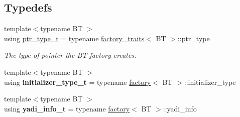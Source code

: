 \subsection*{Typedefs}
\begin{DoxyCompactItemize}
\item 
\mbox{\label{namespaceyadi_a92290eb27cd90666aa87b17d854af9fe}} 
{\footnotesize template$<$typename BT $>$ }\\using \hyperlink{namespaceyadi_a92290eb27cd90666aa87b17d854af9fe}{ptr\+\_\+type\+\_\+t} = typename \hyperlink{structyadi_1_1factory__traits}{factory\+\_\+traits}$<$ BT $>$\+::ptr\+\_\+type
\begin{DoxyCompactList}\small\item\em The type of pointer the BT factory creates. \end{DoxyCompactList}\item 
\mbox{\label{namespaceyadi_a79c8750f81d4b3525cc09362afe610ea}} 
{\footnotesize template$<$typename BT $>$ }\\using {\bfseries initializer\+\_\+type\+\_\+t} = typename \hyperlink{structyadi_1_1factory}{factory}$<$ BT $>$\+::initializer\+\_\+type
\item 
\mbox{\label{namespaceyadi_adf71f730b2dddbbcb78db9a00dbdbed9}} 
{\footnotesize template$<$typename BT $>$ }\\using {\bfseries yadi\+\_\+info\+\_\+t} = typename \hyperlink{structyadi_1_1factory}{factory}$<$ BT $>$\+::yadi\+\_\+info
\end{DoxyCompactItemize}
